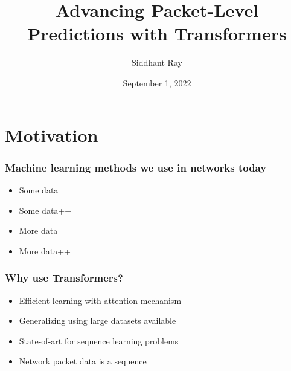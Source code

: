 \documentclass{beamer}
\title[Master Thesis] %
{Advancing Packet-Level Predictions with Transformers}
\date{\tiny September 1, 2022}
\author[ Siddhant Ray] %
{Siddhant Ray}
\institute[ETH Zürich] %
{
  D-ITET \\
  ETH Zürich
}
\begin{document}
\frame{\titlepage}


%


\section{Motivation}

\begin{frame}
\frametitle{Machine learning methods we use in networks today}
\pause
\begin{itemize}
    \item<1-> Some data
    \item<1-> Some data++
    \pause
    \item<2-> More data 
     \item<2-> More data++
\end{itemize}
\end{frame}



\begin{frame}
\frametitle{Why use Transformers?}
\pause
\begin{itemize}
    \item<1-> Efficient learning with attention mechanism
    \item<1-> Generalizing using large datasets available
    \pause
    \item<2-> State-of-art for sequence learning problems
     \item<2-> Network packet data is a sequence
\end{itemize}
\end{frame}
\end{document}
